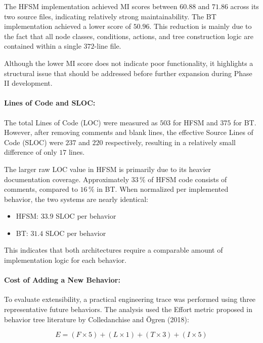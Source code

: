 \documentclass[12pt, a4paper]{report}
\begin{document}
The HFSM implementation achieved MI scores between $60.88$ and $71.86$ across its two source files, indicating relatively strong maintainability. The BT implementation achieved a lower score of $50.96$. This reduction is mainly due to the fact that all node classes, conditions, actions, and tree construction logic are contained within a single $372$-line file.

Although the lower MI score does not indicate poor functionality, it highlights a structural issue that should be addressed before further expansion during Phase II development.

\paragraph{Lines of Code and SLOC:}

The total Lines of Code (LOC) were measured as $503$ for HFSM and $375$ for BT. However, after removing comments and blank lines, the effective Source Lines of Code (SLOC) were $237$ and $220$ respectively, resulting in a relatively small difference of only $17$ lines.

The larger raw LOC value in HFSM is primarily due to its heavier documentation coverage. Approximately $33\,\%$ of HFSM code consists of comments, compared to $16\,\%$ in BT. When normalized per implemented behavior, the two systems are nearly identical:

\begin{itemize}
    \item HFSM: $33.9$ SLOC per behavior
    \item BT: $31.4$ SLOC per behavior
\end{itemize}

This indicates that both architectures require a comparable amount of implementation logic for each behavior.

\paragraph{Cost of Adding a New Behavior:}

To evaluate extensibility, a practical engineering trace was performed using three representative future behaviors. The analysis used the Effort metric proposed in behavior tree literature by Colledanchise and Ögren (2018):

\begin{equation}
E = (F \times 5) + (L \times 1) + (T \times 3) + (I \times 5)
\end{equation}
\end{document}
